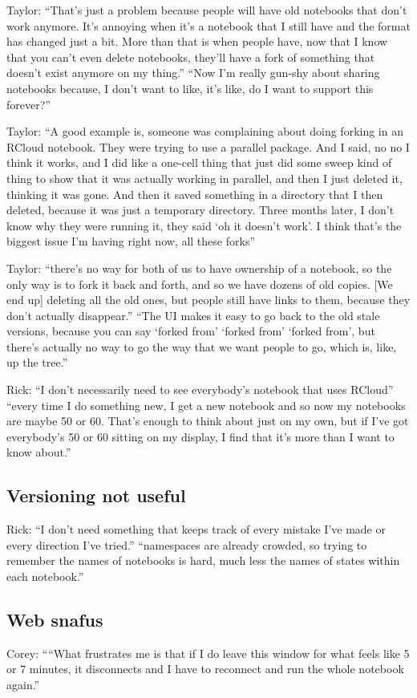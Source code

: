 Taylor: ``That's just a problem because people will have old notebooks that don't work anymore. It's annoying when it's a notebook that I still have and the format has changed just a bit. More than that is when people have, now that I know that you can't even delete notebooks, they'll have a fork of something that doesn't exist anymore on my thing.'' ``Now I'm really gun-shy about sharing notebooks because, I don't want to like, it's like, do I want to support this forever?''

Taylor: ``A good example is, someone was complaining about doing forking in an RCloud notebook. They were trying to use a parallel package. And I said, no no I think it works, and I did like a one-cell thing that just did some sweep kind of thing to show that it was actually working in parallel, and then I just deleted it, thinking it was gone. And then it saved something in a directory that I then deleted, because it was just a temporary directory. Three months later, I don't know why they were running it, they said `oh it doesn't work'. I think that's the biggest issue I'm having right now, all these forks''

Taylor: ``there's no way for both of us to have ownership of a notebook, so the only way is to fork it back and forth, and so we have dozens of old copies. [We end up] deleting all the old ones, but people still have links to them, because they don't actually disappear.'' ``The UI makes it easy to go back to the old stale versions, because you can say `forked from' `forked from' `forked from', but there's actually no way to go the way that we want people to go, which is, like, up the tree.''

Rick: ``I don't necessarily need to see everybody's notebook that uses RCloud'' ``every time I do something new, I get a new notebook and so now my notebooks are maybe 50 or 60. That's enough to think about just on my own, but if I've got everybody's 50 or 60 sitting on my display, I find that it's more than I want to know about.''


\subsection{Versioning not useful}
Rick: ``I don't need something that keeps track of every mistake I've made or every direction I've tried.” ``namespaces are already crowded, so trying to remember the names of notebooks is hard, much less the names of states within each notebook.''


\subsection{Web snafus}
Corey: ``“What frustrates me is that if I do leave this window for what feels like 5 or 7 minutes, it disconnects and I have to reconnect and run the whole notebook again.''

